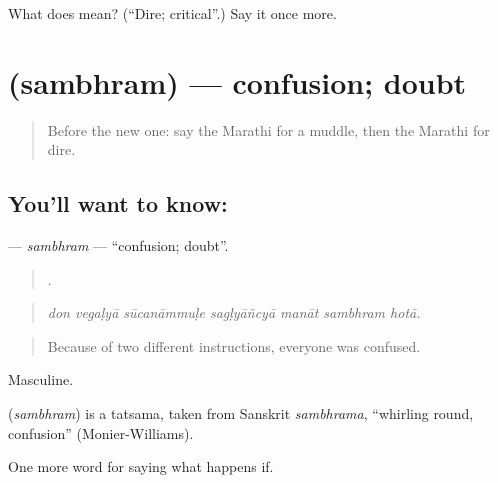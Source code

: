 \begin{tcolorbox}[breakable,colback=teal!4,colframe=teal!35!black,title={Before you move on}]
What does  mean? (\textquotedblleft{}Dire; critical\textquotedblright{}.) Say it once more.
\end{tcolorbox}
\section[\texorpdfstring{\mr{संभ्रम} (sambhram)}{संभ्रम (sambhram)}]{ (sambhram) — confusion; doubt}

\label{lesson:MR-C556-sambhram}



\begin{quote}
Before the new one: say the Marathi for a muddle, then the Marathi for dire.
\end{quote}

\subsection*{You'll want to know: }
\textbf{} — \emph{sambhram} — \textquotedblleft{}confusion; doubt\textquotedblright{}.

\begin{quote}
      .
\end{quote}

\begin{quote}
\emph{don vegaḷyā sūcanāmmuḷe sagḷyāñcyā manāt sambhram hotā.}
\end{quote}

\begin{quote}
Because of two different instructions, everyone was confused.
\end{quote}

Masculine.

\begin{cousinweb}
\textbf{} (\emph{sambhram}) is a tatsama, taken from Sanskrit \emph{sambhrama}, \textquotedblleft{}whirling round, confusion\textquotedblright{} (Monier-Williams).
\end{cousinweb}

\begin{grammarlens}[title={What you've built}]
One more word for saying what happens if.
\end{grammarlens}

